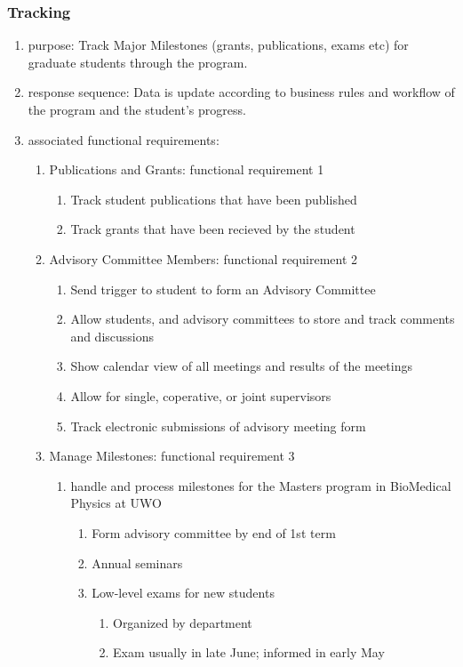 \documentclass{journal}
\begin{document}
\subsubsection{Tracking}
\begin{enumerate}
\item purpose: Track Major Milestones (grants, publications, exams etc) for graduate students through the program.
\item response sequence: Data is update according to business rules and workflow of the program and the student's progress.
\item associated functional requirements:
\begin{enumerate}
\item Publications and Grants: functional requirement 1
\begin{enumerate}
			\item Track student publications that have been published 
			\item Track grants that have been recieved by the student
\end{enumerate}
\item Advisory Committee Members: functional requirement 2
\begin{enumerate}
			\item Send trigger to student to form an Advisory Committee
			\item Allow students, and advisory committees to store and track comments and discussions
			\item Show calendar view of all meetings and results of the meetings
			\item Allow for single, coperative, or joint supervisors 
			\item Track electronic submissions of advisory meeting form
\end{enumerate}
\item Manage Milestones: functional requirement 3
\begin{enumerate}
    \item handle and process milestones for the Masters program in BioMedical Physics at UWO
    \begin{enumerate}
			\item Form advisory committee by end of 1st term
			\item Annual seminars 
			\item Low-level exams for new students
			\begin{enumerate}
			\item Organized by department
			\item Exam usually in late June; informed in early May

\end{enumerate}
\end{enumerate}
\end{enumerate}
\end{enumerate}
\end{enumerate}
\end{document}
